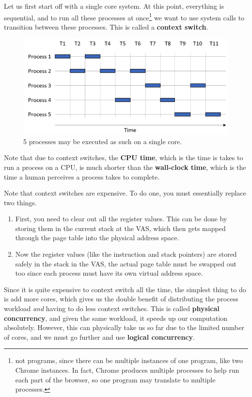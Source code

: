 \documentclass{article}
\begin{document}
    \begin{definition}
      Let us first start off with a single core system. At this point, everything is sequential, and to run all these processes at once\footnote{not programs, since there can be multiple instances of one program, like two Chrome instances. In fact, Chrome produces multiple processes to help run each part of the browser, so one program may translate to multiple processes. } we want to use system calls to transition between these processes. This is called a \textbf{context switch}. 

      \begin{figure}[H]
        \centering 
        \includegraphics[scale=0.4]{img/seq_ex.png}
        \caption{5 processes may be executed as such on a single core. } 
        \label{fig:context_switch}
      \end{figure}
      Note that due to context switches, the \textbf{CPU time}, which is the time is takes to run a process on a CPU, is much shorter than the \textbf{wall-clock time}, which is the time a human perceives a process takes to complete. 
    \end{definition}

    Note that context switches are expensive. To do one, you must essentially replace two things. 
    \begin{enumerate}
      \item First, you need to clear out all the register values. This can be done by storing them in the current stack at the VAS, which then gets mapped through the page table into the physical address space. 
      \item Now the register values (like the instruction and stack pointers) are stored safely in the stack in the VAS, the actual page table must be swapped out too since each process must have its own virtual address space. 
    \end{enumerate}
    Since it is quite expensive to context switch all the time, the simplest thing to do is add more cores, which gives us the double benefit of distributing the process workload \textit{and} having to do less context switches. This is called \textbf{physical concurrency}, and given the same workload, it speeds up our computation absolutely. However, this can physically take us so far due to the limited number of cores, and we must go further and use \textbf{logical concurrency}. 
\end{document}
